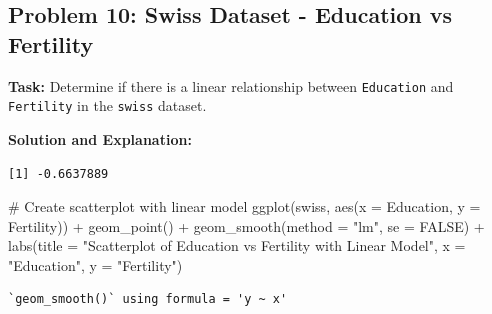 \documentclass[
  letterpaper,
  DIV=11,
  numbers=noendperiod]{scrreprt}
\newenvironment{Shaded}{\begin{snugshade}}{\end{snugshade}}
\newcommand{\AttributeTok}[1]{\textcolor[rgb]{0.40,0.45,0.13}{#1}}
\newcommand{\CommentTok}[1]{\textcolor[rgb]{0.37,0.37,0.37}{#1}}
\newcommand{\ConstantTok}[1]{\textcolor[rgb]{0.56,0.35,0.01}{#1}}
\newcommand{\FunctionTok}[1]{\textcolor[rgb]{0.28,0.35,0.67}{#1}}
\newcommand{\NormalTok}[1]{\textcolor[rgb]{0.00,0.23,0.31}{#1}}
\newcommand{\OtherTok}[1]{\textcolor[rgb]{0.00,0.23,0.31}{#1}}
\newcommand{\SpecialCharTok}[1]{\textcolor[rgb]{0.37,0.37,0.37}{#1}}
\newcommand{\StringTok}[1]{\textcolor[rgb]{0.13,0.47,0.30}{#1}}
\begin{document}
\subsection*{Problem 10: Swiss Dataset - Education vs
Fertility}\label{problem-10-swiss-dataset---education-vs-fertility-1}

\textbf{Task:} Determine if there is a linear relationship between
\texttt{Education} and \texttt{Fertility} in the \texttt{swiss} dataset.

\textbf{Solution and Explanation:}

\begin{Shaded}
\end{Shaded}

\begin{verbatim}
[1] -0.6637889
\end{verbatim}

\begin{Shaded}
\begin{Highlighting}[]
\CommentTok{\# Create scatterplot with linear model}
\FunctionTok{ggplot}\NormalTok{(swiss, }\FunctionTok{aes}\NormalTok{(}\AttributeTok{x =}\NormalTok{ Education, }\AttributeTok{y =}\NormalTok{ Fertility)) }\SpecialCharTok{+}
  \FunctionTok{geom\_point}\NormalTok{() }\SpecialCharTok{+}
  \FunctionTok{geom\_smooth}\NormalTok{(}\AttributeTok{method =} \StringTok{"lm"}\NormalTok{, }\AttributeTok{se =} \ConstantTok{FALSE}\NormalTok{) }\SpecialCharTok{+}
  \FunctionTok{labs}\NormalTok{(}\AttributeTok{title =} \StringTok{"Scatterplot of Education vs Fertility with Linear Model"}\NormalTok{, }\AttributeTok{x =} \StringTok{"Education"}\NormalTok{, }\AttributeTok{y =} \StringTok{"Fertility"}\NormalTok{)}
\end{Highlighting}
\end{Shaded}

\begin{verbatim}
`geom_smooth()` using formula = 'y ~ x'
\end{verbatim}
\end{document}
